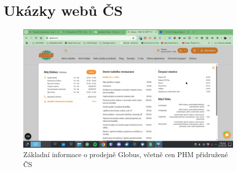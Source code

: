 \chapter{Ukázky webů ČS}

\begin{figure}
    \centering
    \includegraphics[width=\textwidth]{Figures/globus_vyber.jpg}
    \caption{Základní informace o prodejně Globus, včetně cen PHM
        přidružené ČS}
    \label{fig:globus-cs}
\end{figure}
